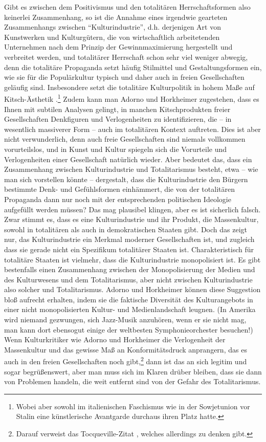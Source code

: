 \documentclass[12pt,a4paper,ngerman]{article}
\begin{document}
Gibt es zwischen dem Positivismus und den totalitären
Herrschaftsformen also keinerlei Zusammenhang, so ist die Annahme
eines irgendwie gearteten Zusammenhangs zwischen "`Kulturindustrie"',
d.h. derjenigen Art von Kunstwerken und Kulturgütern, die von
wirtschaftlich arbeitetenden Unternehmen nach dem Prinzip der
Gewinnmaximierung hergestellt und verbreitet werden, und totalitärer
Herrschaft schon sehr viel weniger abwegig, denn die totalitäre
Propaganda setzt häufig Stilmittel und Gestaltungsformen ein, wie sie
für die Populärkultur typisch und daher auch in freien Gesellschaften
geläufig sind. Insbesondere setzt die totalitäre Kulturpolitik in
hohem Maße auf Kitsch-Ästhetik \cite[S.
63ff.]{benz:2000}.\footnote{Wobei aber sowohl im italienischen
  Faschismus wie in der Sowjetunion vor Stalin eine künstlerische
  Avantgarde durchaus ihren Platz hatte.} Zudem kann man Adorno und
Horkheimer zugestehen, dass es Ihnen mit subtilen Analysen gelingt, in
manchen Kitschprodukten freier Gesellschaften Denkfiguren und
Verlogenheiten zu identifizieren, die -- in wesentlich massiverer Form
-- auch im totalitären Kontext auftreten. Dies ist aber nicht
verwunderlich, denn auch freie Gesellschaften sind niemals vollkommen
vorurteilslos, und in Kunst und Kultur spiegeln sich die Vorurteile
und Verlogenheiten einer Gesellschaft natürlich wieder. Aber bedeutet
das, dass ein Zusammenhang zwischen Kulturindustrie und Totalitarismus
besteht, etwa -- wie man sich vorstellen könnte -- dergestalt, dass
die Kulturindustrie den Bürgern bestimmte Denk- und Gefühlsformen
einhämmert, die von der totalitären Propaganda dann nur noch mit der
entsprechenden politischen Ideologie aufgefüllt werden müssen? Das mag
plausibel klingen, aber es ist sicherlich falsch.  Zwar stimmt es,
dass es eine Kulturindustrie und ihr Produkt, die Massenkultur, sowohl
in totalitären als auch in demokratischen Staaten gibt. Doch das zeigt
nur, das Kulturindustrie ein Merkmal moderner Gesellschaften ist, und
zugleich dass sie gerade nicht ein Spezifikum totalitärer Staaten ist.
Charakteristisch für totalitäre Staaten ist vielmehr, dass die
Kulturindustrie monopolisiert ist. Es gibt bestenfalls einen Zusammenhang
zwischen der Monopolisierung der Medien und des Kulturwesens und dem
Totalitarismus, aber nicht zwischen Kulturindustrie also solcher und
Totalitarismus. Adorno und Horkheimer können diese Suggestion bloß
aufrecht erhalten, indem sie die faktische Diversität des
Kulturangebots in einer nicht monopolisierten Kultur- und
Medienlandschaft leugnen. (In Amerika wird niemand gezwungen, sich
Jazz-Musik anzuhören, wenn er sie nicht mag, man kann dort ebensogut
einige der weltbesten Symphonieorchester besuchen!) Wenn
Kulturkritiker wie Adorno und Horkheimer die Verlogenheit der
Massenkultur und das gewisse Maß an Konformitätsdruck anprangern, das
es auch in den freien Gesellschaften noch gibt,\footnote{Darauf
  verweist das Tocqueville-Zitat \cite[S.
  141]{adorno-horkheimer:1947}, welches allerdings zu denken gibt.}
dann ist das an sich legitim und sogar begrüßenswert, aber man muss
sich im Klaren drüber bleiben, dass sie dann von Problemen handeln,
die weit entfernt sind von der Gefahr des Totalitarismus.
\end{document}
